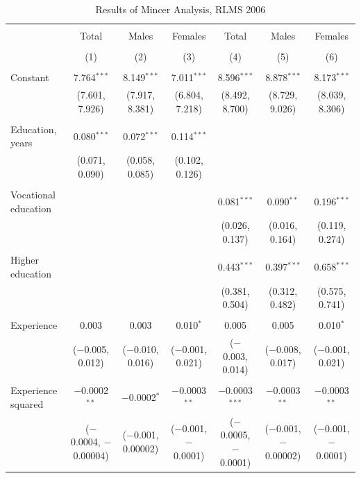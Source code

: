 \documentclass[alpha-refs]{wiley-article-01g}
\begin{document}
\begin{landscape}
	
	\fontsize{9}{11}
	\selectfont
	
	\begin{table}[!htbp] \centering 
\renewcommand{\arraystretch}{1.0}
		\caption{Results of Mincer Analysis, RLMS 2006} 
		\label{} 
		\begin{tabular}{@{\extracolsep{5pt}}lcccccc} 
			\\[-.8ex]\hline 
			\hline \\[-.8ex] 
			& Total & Males & Females & Total & Males & Females \\ 
			\\[-.8ex] & (1) & (2) & (3) & (4) & (5) & (6)\\ 
			\hline \\[-.8ex] 
			Constant & 7.764$^{***}$ & 8.149$^{***}$ & 7.011$^{***}$ & 8.596$^{***}$ & 8.878$^{***}$ & 8.173$^{***}$ \\ 
			& (7.601, 7.926) & (7.917, 8.381) & (6.804, 7.218) & (8.492, 8.700) & (8.729, 9.026) & (8.039, 8.306) \\ 
			& & & & & & \\ 
			Education, years & 0.080$^{***}$ & 0.072$^{***}$ & 0.114$^{***}$ &  &  &  \\ 
			& (0.071, 0.090) & (0.058, 0.085) & (0.102, 0.126) &  &  &  \\ 
			& & & & & & \\ 
			Vocational education &  &  &  & 0.081$^{***}$ & 0.090$^{**}$ & 0.196$^{***}$ \\ 
			&  &  &  & (0.026, 0.137) & (0.016, 0.164) & (0.119, 0.274) \\ 
			& & & & & & \\ 
			Higher education &  &  &  & 0.443$^{***}$ & 0.397$^{***}$ & 0.658$^{***}$ \\ 
			&  &  &  & (0.381, 0.504) & (0.312, 0.482) & (0.575, 0.741) \\ 
			& & & & & & \\ 
			Experience & 0.003 & 0.003 & 0.010$^{*}$ & 0.005 & 0.005 & 0.010$^{*}$ \\ 
			& ($-$0.005, 0.012) & ($-$0.010, 0.016) & ($-$0.001, 0.021) & ($-$0.003, 0.014) & ($-$0.008, 0.017) & ($-$0.001, 0.021) \\ 
			& & & & & & \\ 
			Experience squared & $-$0.0002$^{**}$ & $-$0.0002$^{*}$ & $-$0.0003$^{**}$ & $-$0.0003$^{***}$ & $-$0.0003$^{**}$ & $-$0.0003$^{**}$ \\ 
			& ($-$0.0004, $-$0.00004) & ($-$0.001, 0.00002) & ($-$0.001, $-$0.0001) & ($-$0.0005, $-$0.0001) & ($-$0.001, $-$0.00002) & ($-$0.001, $-$0.0001) \\ 

\end{tabular}
\end{table}
\end{landscape}
\end{document}
